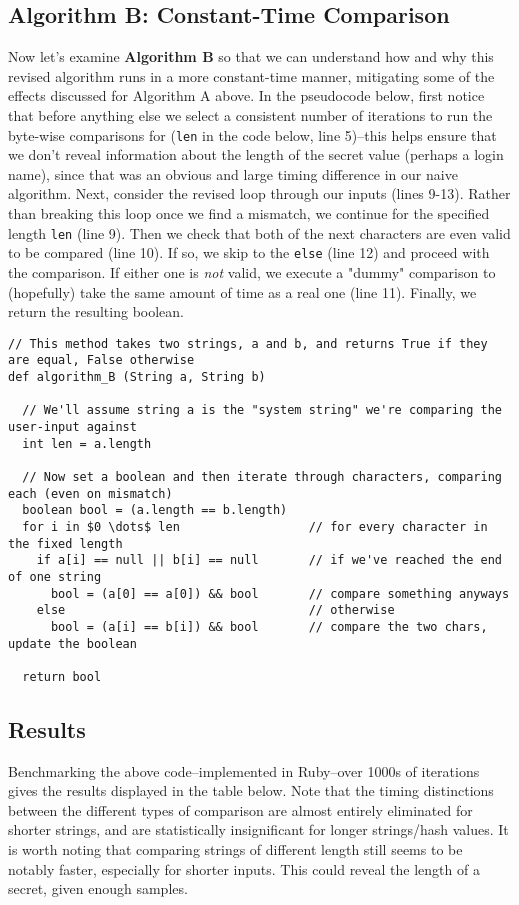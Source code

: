 \documentclass{article}
\providecommand{\inlinecode}{\texttt}
\begin{document}
\subsection*{Algorithm B: Constant-Time Comparison}
Now let's examine \textbf{Algorithm B} so that we can understand how and why this revised algorithm runs in a more constant-time manner, mitigating some of the effects discussed for Algorithm A above.
In the pseudocode below, first notice that before anything else we select a consistent number of iterations to run the byte-wise comparisons for (\inlinecode{len} in the code below, line 5)--this helps ensure that we don't reveal information about the length of the secret value (perhaps a login name), since that was an obvious and large timing difference in our naive algorithm.
Next, consider the revised loop through our inputs (lines 9-13). Rather than breaking this loop once we find a mismatch, we continue for the specified length \inlinecode{len} (line 9).
Then we check that both of the next characters are even valid to be compared (line 10). If so, we skip to the \inlinecode{else} (line 12) and proceed with the comparison. If either one is \textit{not} valid, we execute a "dummy" comparison to (hopefully) take the same amount of time as a real one (line 11).
Finally, we return the resulting boolean.

\begin{lstlisting}
// This method takes two strings, a and b, and returns True if they are equal, False otherwise
def algorithm_B (String a, String b)

  // We'll assume string a is the "system string" we're comparing the user-input against
  int len = a.length

  // Now set a boolean and then iterate through characters, comparing each (even on mismatch)
  boolean bool = (a.length == b.length)
  for i in $0 \dots$ len                  // for every character in the fixed length
    if a[i] == null || b[i] == null       // if we've reached the end of one string
      bool = (a[0] == a[0]) && bool       // compare something anyways
    else                                  // otherwise
      bool = (a[i] == b[i]) && bool       // compare the two chars, update the boolean

  return bool
\end{lstlisting}


\subsection*{Results}
Benchmarking the above code--implemented in Ruby--over 1000s of iterations gives the results displayed in the table below. Note that the timing distinctions between the different types of comparison are almost entirely eliminated for shorter strings, and are statistically insignificant for longer strings/hash values. It is worth noting that comparing strings of different length still seems to be notably faster, especially for shorter inputs. This could reveal the length of a secret, given enough samples.
\end{document}
